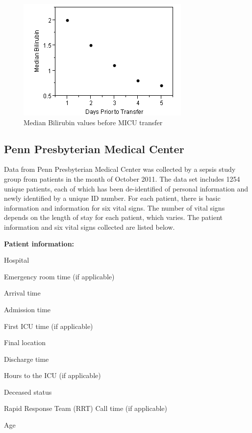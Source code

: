 \documentclass{sig-alternate}
\begin{document}
\begin{figure}
	\begin{center}
		\includegraphics[width=1.0\linewidth]{BilirubinGraph.png}
	\end{center}
	\caption{Median Bilirubin values before MICU transfer}
	\label{fig:bilirubin}
\end{figure}

\vspace{10pt}
\subsection{Penn Presbyterian Medical Center}
\label{subsec:presby}
\vspace{10pt}

Data from Penn Presbyterian Medical Center was collected by a sepsis study group from patients in the month of October 2011.  The data set includes 1254 unique patients, each of which has been de-identified of personal information and newly identified by a unique ID number.  For each patient, there is basic information and information for six vital signs.  The number of vital signs depends on the length of stay for each patient, which varies.  The patient information and six vital signs collected are listed below.
\linebreak

\noindent \textbf{Patient information:}
\begin{itemize*}
  \item Hospital
  \item Emergency room time (if applicable)
  \item Arrival time
  \item Admission time
  \item First ICU time (if applicable)
  \item Final location
  \item Discharge time
  \item Hours to the ICU (if applicable)
  \item Deceased status
  \item Rapid Response Team (RRT) Call time (if applicable)
  \item Age
\end{itemize*}
\end{document}
